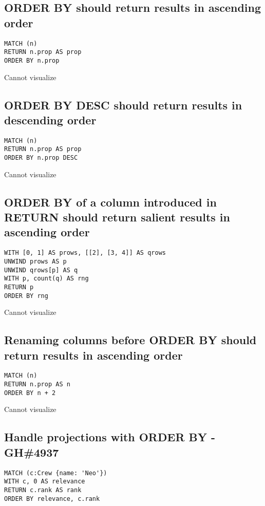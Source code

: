 \subsection{ORDER BY should return results in ascending order}

\begin{lstlisting}
MATCH (n)
RETURN n.prop AS prop
ORDER BY n.prop
\end{lstlisting}

Cannot visualize
\subsection{ORDER BY DESC should return results in descending order}

\begin{lstlisting}
MATCH (n)
RETURN n.prop AS prop
ORDER BY n.prop DESC
\end{lstlisting}

Cannot visualize
\subsection{ORDER BY of a column introduced in RETURN should return salient results in ascending order}

\begin{lstlisting}
WITH [0, 1] AS prows, [[2], [3, 4]] AS qrows
UNWIND prows AS p
UNWIND qrows[p] AS q
WITH p, count(q) AS rng
RETURN p
ORDER BY rng
\end{lstlisting}

Cannot visualize
\subsection{Renaming columns before ORDER BY should return results in ascending order}

\begin{lstlisting}
MATCH (n)
RETURN n.prop AS n
ORDER BY n + 2
\end{lstlisting}

Cannot visualize
\subsection{Handle projections with ORDER BY - GH\#4937}

\begin{lstlisting}
MATCH (c:Crew {name: 'Neo'})
WITH c, 0 AS relevance
RETURN c.rank AS rank
ORDER BY relevance, c.rank
\end{lstlisting}

